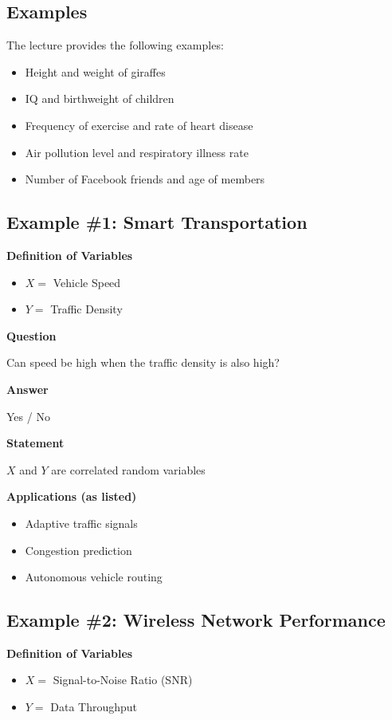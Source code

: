 \documentclass[12pt]{article}
\begin{document}
\subsection{Examples}

The lecture provides the following examples:

\begin{itemize}
\item Height and weight of giraffes
\item IQ and birthweight of children
\item Frequency of exercise and rate of heart disease
\item Air pollution level and respiratory illness rate
\item Number of Facebook friends and age of members
\end{itemize}

\subsection{Example \#1: Smart Transportation}

\textbf{Definition of Variables}
\begin{itemize}
\item $X =$ Vehicle Speed
\item $Y =$ Traffic Density
\end{itemize}

\textbf{Question}

Can speed be high when the traffic density is also high?

\textbf{Answer}

Yes / No

\textbf{Statement}

$X$ and $Y$ are correlated random variables

\textbf{Applications (as listed)}

\begin{itemize}
\item Adaptive traffic signals
\item Congestion prediction
\item Autonomous vehicle routing
\end{itemize}

\subsection{Example \#2: Wireless Network Performance}

\textbf{Definition of Variables}
\begin{itemize}
\item $X =$ Signal-to-Noise Ratio (SNR)
\item $Y =$ Data Throughput
\end{itemize}
\end{document}
